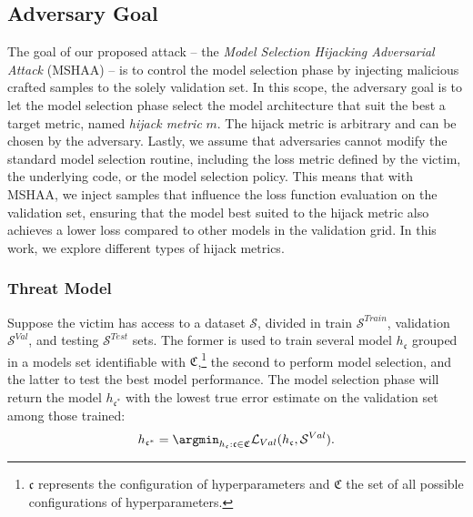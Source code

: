 \subsection{Adversary Goal}
The goal of our proposed attack -- the \textit{Model Selection Hijacking Adversarial Attack} (MSHAA) -- is to control the model selection phase by injecting malicious crafted samples to the solely validation set.  
In this scope, the adversary goal is to let the model selection phase select the model architecture that suit the best a target metric, named \textit{hijack metric} $m$. 
The hijack metric is arbitrary and can be chosen by the adversary. 
Lastly, we assume that adversaries cannot modify the standard model selection routine, including the loss metric defined by the victim, the underlying code, or the model selection policy. This means that with MSHAA, we inject samples that influence the loss function evaluation on the validation set, ensuring that the model best suited to the hijack metric also achieves a lower loss compared to other models in the validation grid.
In this work, we explore different types of hijack metrics. 

%
\subsubsection{Threat Model}
Suppose the victim has access to a dataset $\mathcal{S}$, divided in train $\mathcal{S}^{Train}$, validation $\mathcal{S}^{Val}$, and testing $\mathcal{S}^{Test}$ sets.%
%
The former is used to train several model $h_{\mathfrak{c}}$ grouped in a models %
set identifiable with $\mathfrak{C}$,\footnote{$\mathfrak{c}$ represents the configuration of hyperparameters and $\mathfrak{C}$ the set of all possible configurations of hyperparameters.} the second to perform model selection, and the latter to test the best model performance. %
The model selection phase will return the model $h_{\mathfrak{c}^*}$ with the lowest true error estimate on the validation set among those trained:
    \begin{equation}
        \label{best_val}
 h_{\mathfrak{c}^*} = \argmin_{h_{\mathfrak{c}} : \mathfrak{c} \in \mathfrak{C}} \mathcal{L}_{Val}(h_{\mathfrak{c}}, \mathcal{S}^{Val}).
    \end{equation}

